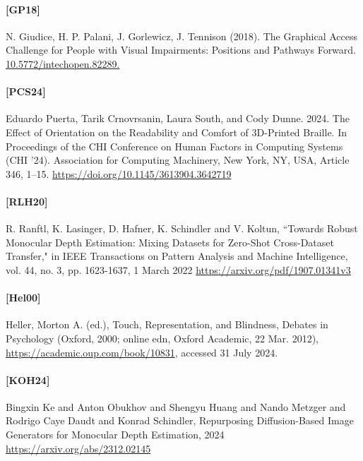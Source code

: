 \documentclass[12pt, letterpaper]{article}
\begin{document}
\paragraph{[GP18]}
\hypertarget{GP18target}{}
N. Giudice, H. P. Palani, J. Gorlewicz, J. Tennison (2018). The Graphical Access Challenge for People with Visual Impairments: Positions and Pathways Forward.
\href{https://www.researchgate.net/publication/330940759_The_Graphical_Access_Challenge_for_People_with_Visual_Impairments_Positions_and_Pathways_Forward}{10.5772/intechopen.82289.}

\paragraph{[PCS24]}
\hypertarget{PCS24target}{}
Eduardo Puerta, Tarik Crnovrsanin, Laura South, and Cody Dunne. 2024. The Effect of Orientation on the Readability and Comfort of 3D-Printed Braille.
In Proceedings of the CHI Conference on Human Factors in Computing Systems (CHI '24). Association for Computing Machinery, New York, NY, USA, Article 346, 1–15.
\href{ https://doi.org/10.1145/3613904.3642719}{ https://doi.org/10.1145/3613904.3642719}

\paragraph{[RLH20]}
\hypertarget{RLH20target}{}
R. Ranftl, K. Lasinger, D. Hafner, K. Schindler and V. Koltun, ``Towards Robust Monocular Depth Estimation: Mixing Datasets for Zero-Shot Cross-Dataset Transfer,"
in IEEE Transactions on Pattern Analysis and Machine Intelligence, vol. 44, no. 3, pp. 1623-1637, 1 March 2022
\href{https://arxiv.org/pdf/1907.01341v3}{https://arxiv.org/pdf/1907.01341v3}


\paragraph{[Hel00]}
\hypertarget{Hel00target}{}
Heller, Morton A. (ed.), Touch, Representation, and Blindness, Debates in Psychology (Oxford, 2000; online edn, Oxford Academic, 22 Mar. 2012),\\
\href{https://academic.oup.com/book/10831}{https://academic.oup.com/book/10831}, accessed 31 July 2024.


\paragraph{[KOH24]}
\hypertarget{KOH24target}{}
Bingxin Ke and Anton Obukhov and Shengyu Huang and Nando Metzger and Rodrigo Caye Daudt and Konrad Schindler,
Repurposing Diffusion-Based Image Generators for Monocular Depth Estimation, 2024\\
\href{https://arxiv.org/abs/2312.02145}{https://arxiv.org/abs/2312.02145}
\end{document}
